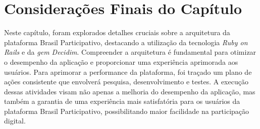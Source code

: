 \section{Considerações Finais do Capítulo}

Neste capítulo, foram explorados detalhes cruciais sobre a arquitetura da plataforma Brasil Participativo, destacando a utilização da tecnologia \textit{Ruby on Rails} e da \textit{gem Decidim}. Compreender a arquitetura é fundamental para otimizar o desempenho da aplicação e proporcionar uma experiência aprimorada aos usuários. Para aprimorar a performance da plataforma, foi traçado um plano de ações consistente que envolverá pesquisa, desenvolvimento e testes. A execução dessas atividades visam não apenas a melhoria do desempenho da aplicação, mas também a garantia de uma experiência mais satisfatória para os usuários da plataforma Brasil Participativo, possibilitando maior facilidade na participação digital.